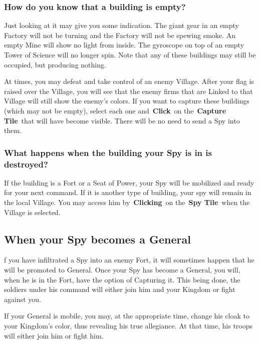 \subsubsection{How do you know that a building is empty?}

Just looking at it may give you some indication. The giant gear in an empty Factory will not be turning and the Factory will not be spewing smoke. An empty Mine will show no light from inside. The gyroscope on top of an empty Tower of Science will no longer spin. Note that any of these buildings may still be occupied, but producing nothing.

At times, you may defeat and take control of an enemy Village. After your flag is raised over the Village, you will see that the enemy firms that are Linked to that Village will still show the enemy’s colors. If you want to capture these buildings (which may not be empty), select each one and \textbf{Click} on the \textbf{Capture Tile} that will have become visible. There will be no need to send a Spy into them.

\subsubsection{What happens when the building your Spy is in is destroyed?}

If the building is a Fort or a Seat of Power, your Spy will be mobilized and ready for your next command. If it is another type of building, your spy will remain in the local Village. You may access him by \textbf{Clicking} on the \textbf{Spy Tile} when the Village is selected.

\subsection{When your Spy becomes a General}


f you have infiltrated a Spy into an enemy Fort, it will sometimes happen that he will be promoted to General. Once your Spy has become a General, you will, when he is in the Fort, have the option of Capturing it. This being done, the soldiers under his command will either join him and your Kingdom or fight against you.

If your General is mobile, you may, at the appropriate time, change his cloak to your Kingdom’s color, thus revealing his true allegiance. At that time, his troops will either join him or fight him.

